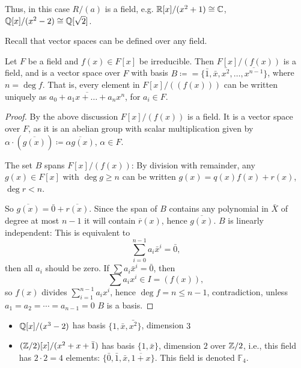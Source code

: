 \documentclass[10pt, a4paper]{article}
\begin{document}
Thus,
in this case $R / (a)$ is a field,
e.g. $\mathbb{R}[x] / (x ^ 2 + 1) \cong \mathbb{C}$,
$\mathbb{Q}[x] / (x ^ 2 - 2) \cong \mathbb{Q}[\sqrt{2}]$.

Recall that vector spaces can be defined over any field.

\begin{theorem}
    Let $F$ be a field and $f(x) \in F[x]$ be irreducible.
    Then $F[x] / (f(x))$ is a field,
    and is a vector space over $F$ with basis $B \coloneqq = \{\bar{1}, \bar{x}, \bar{x ^ 2}, \dotsc, \overline{x ^ {n - 1}}\}$,
    where $n = \deg{f}$.
    That is,
    every element in $F[x] / ((f(x)))$ can be written uniquely as $\overline{a_0 + a_1x + \dotsc + a_nx ^ n}$,
    for $a_i \in F$.

    \begin{proof}
        By the above discussion $F[x] / (f(x))$ is a field.
        It is a vector space over $F$,
        as it is an abelian group with scalar multiplication given by $\alpha \cdot (\overline{g(x)}) \coloneqq \overline{\alpha g(x)}$,
        $\alpha \in F$.

        The set $B$ spans $F[x] / (f(x))$:
        By division with remainder,
        any $g(x) \in F[x]$ with $\deg{g} \geq n$ can be written $g(x) = q(x)f(x) + r(x)$,
        $\deg{r} < n$.

        So $\overline{g(x)} = \bar{0} + \overline{r(x)}$.
        Since the span of $B$ contains any polynomial in $\bar{X}$ of degree at most $n - 1$ it will contain $\overline{r}(x)$,
        hence $\overline{g(x)}$.
        $B$ is linearly independent:
        This is equivalent to
        \[
        \sum_{i = 0}^{n - 1}a_i\bar{x} ^ i = \bar{0},
        \]
        then all $a_i$ should be zero.
        If $\sum a_i\bar{x} ^ i = \bar{0}$,
        then
        \[
        \sum a_i x ^ i \in I = (f(x)),
        \]
        so $f(x)$ divides $\sum_{i = 1}^{n - 1} a_ix ^ i$,
        hence $\deg{f} = n \leq n - 1$,
        contradiction,
        unless $a_1 = a_2 = \dotsi = a_{n - 1} = 0$ $B$ is a basis.
    \end{proof}
\end{theorem}

\begin{example}\phantom{}
    \begin{itemize}[label = -]
        \item $\mathbb{Q}[x] / (x ^ 3 - 2)$ has basis $\{1, \bar{x}, \bar{x ^ 2}\}$,
        dimension $3$
        
        \item $(\mathbb{Z} / 2)[x] / (x ^ 2 + x + \bar{1})$ has basis $\{1, \bar{x}\}$,
        dimension $2$ over $\mathbb{Z} / 2$,
        i.e.,
        this field has $2 \cdot 2 = 4$ elements:
        $\{\bar{0}, \bar{1}, \bar{x}, \overline{1 + x}\}$.
        This field is denoted $\mathbb{F}_4$.
    \end{itemize}
\end{example}
\end{document}

